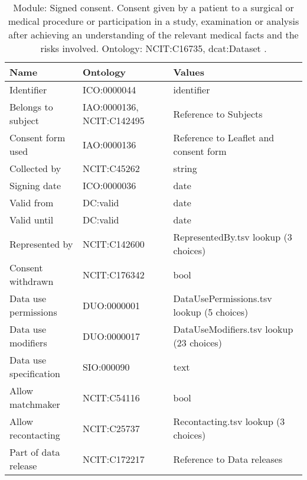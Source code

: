\documentclass{article}
\begin{document}
\begin{table}[htb]
\begin{tabular}{lll}
Name & Ontology & Values \\
\hline
Identifier & ICO:0000044  & identifier \\
Belongs to subject & IAO:0000136, NCIT:C142495  & Reference to Subjects \\
Consent form used & IAO:0000136  & Reference to Leaflet and consent form \\
Collected by & NCIT:C45262  & string \\
Signing date & ICO:0000036  & date \\
Valid from & DC:valid  & date \\
Valid until & DC:valid  & date \\
Represented by & NCIT:C142600  & RepresentedBy.tsv lookup (3 choices) \\
Consent withdrawn & NCIT:C176342  & bool \\
Data use permissions & DUO:0000001  & DataUsePermissions.tsv lookup (5 choices) \\
Data use modifiers & DUO:0000017  & DataUseModifiers.tsv lookup (23 choices) \\
Data use specification & SIO:000090  & text \\
Allow matchmaker & NCIT:C54116  & bool \\
Allow recontacting & NCIT:C25737  & Recontacting.tsv lookup (3 choices) \\
Part of data release & NCIT:C172217  & Reference to Data releases \\
\hline
\end{tabular}
\caption[Module: Signed consent]{\label{table:table14} Module: Signed consent. Consent given by a patient to a surgical or medical procedure or participation in a study, examination or analysis after achieving an understanding of the relevant medical facts and the risks involved. Ontology: NCIT:C16735, dcat:Dataset . }
\end{table}
\end{document}
